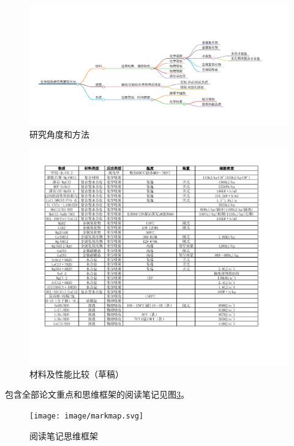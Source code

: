 \documentclass[oneside]{report}
\begin{document}
\begin{figure}[H]
    \centering
    \includegraphics[width=\textwidth]{image/CHS研究角度和方法.pdf}
    \caption{研究角度和方法}
    \label{fig:研究角度}
\end{figure}
\begin{figure}[H]
    \centering
    \includegraphics[width=\textwidth]{image/性能比较.pdf}
    \caption{材料及性能比较（草稿）}
    \label{fig:材料对比}
\end{figure}

包含全部论文重点和思维框架的阅读笔记见图\ref{fig:笔记}。

\begin{figure}[H]
    \centering
    \texttt{[image: image/markmap.svg]}
    \caption{阅读笔记思维框架}
    \label{fig:笔记}
\end{figure}
\end{document}
